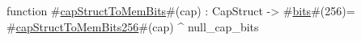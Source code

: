 function #\hyperref[zcapStructToMemBits]{capStructToMemBits}#(cap) : CapStruct -> #\hyperref[zbits]{bits}#(256)=
  #\hyperref[zcapStructToMemBitstwofivesix]{capStructToMemBits256}#(cap) ^ null_cap_bits
